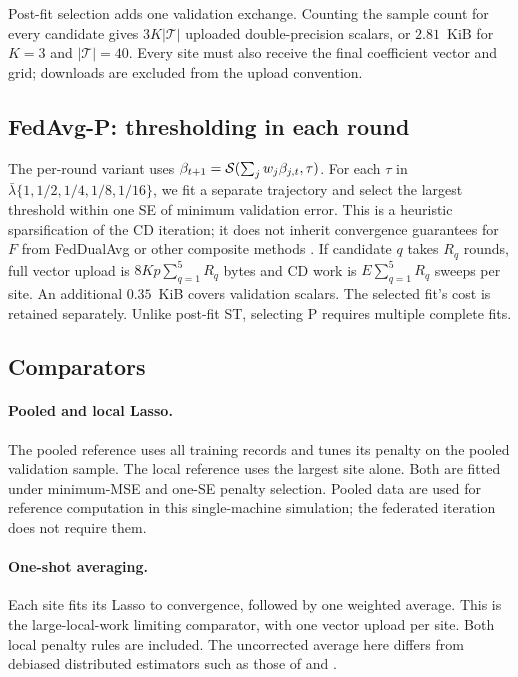 Post-fit selection adds one validation exchange. Counting the sample count
for every candidate gives $3K|\mathcal T|$ uploaded double-precision scalars,
or $2.81$~KiB for $K=3$ and $|\mathcal T|=40$. Every site must also receive
the final coefficient vector and grid; downloads are excluded from the
upload convention.

\subsection{FedAvg-P: thresholding in each round}

The per-round variant uses
$\beta_{t+1}=\mathcal{S}(\sum_jw_j\beta_{j,t},\tau)$.
For each $\tau$ in $\bar\lambda\{1,1/2,1/4,1/8,1/16\}$, we fit a separate
trajectory and select the largest threshold within one SE of minimum
validation error. This is a heuristic sparsification of the CD iteration;
it does not inherit convergence guarantees for $F$ from FedDualAvg or
other composite methods \citep{yuan2021fco,bao2022}.
If candidate $q$ takes $R_q$ rounds, full vector upload is
$8Kp\sum_{q=1}^5R_q$ bytes and CD work is
$E\sum_{q=1}^5R_q$ sweeps per site. An additional $0.35$~KiB covers
validation scalars. The selected fit's cost is retained separately.
Unlike post-fit ST, selecting P requires multiple complete fits.

\subsection{Comparators}

\paragraph{Pooled and local Lasso.}
The pooled reference uses all training records and tunes its penalty on the
pooled validation sample. The local reference uses the largest site alone.
Both are fitted under minimum-MSE and one-SE penalty selection. Pooled data
are used for reference computation in this single-machine simulation;
the federated iteration does not require them.

\paragraph{One-shot averaging.}
Each site fits its Lasso to convergence, followed by one weighted average.
This is the large-local-work limiting comparator, with one vector upload
per site. Both local penalty rules are included. The uncorrected average
here differs from debiased distributed estimators such as those of
\citet{lee2017} and \citet{battey2018}.

